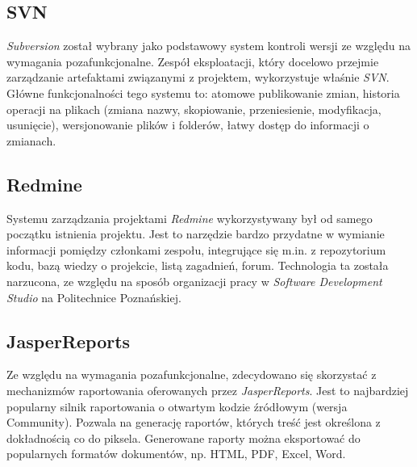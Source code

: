 \subsection{SVN}
\label{Chapter632}

\emph{Subversion} został wybrany jako podstawowy system kontroli wersji ze względu na wymagania pozafunkcjonalne. Zespół eksploatacji, który docelowo przejmie zarządzanie artefaktami związanymi z projektem, wykorzystuje właśnie \textit{SVN}. Główne funkcjonalności tego systemu to: atomowe publikowanie zmian, historia operacji na plikach (zmiana nazwy, skopiowanie, przeniesienie, modyfikacja, usunięcie), wersjonowanie plików i folderów, łatwy dostęp do informacji o zmianach.

\subsection{Redmine}
\label{Chapter633}

Systemu zarządzania projektami \emph{Redmine} wykorzystywany był od samego początku istnienia projektu. Jest to narzędzie bardzo przydatne w wymianie informacji pomiędzy członkami zespołu, integrujące się m.in. z repozytorium kodu, bazą wiedzy o projekcie, listą zagadnień, forum.  Technologia ta została narzucona, ze względu na sposób organizacji pracy w \textit{Software Development Studio} na Politechnice Poznańskiej.

\subsection{JasperReports}
\label{Chapter634}

Ze względu na wymagania pozafunkcjonalne, zdecydowano się skorzystać z mechanizmów raportowania oferowanych przez \emph{JasperReports}. Jest to najbardziej popularny silnik raportowania o otwartym kodzie źródłowym (wersja Community). Pozwala na generację raportów, których treść jest określona z dokładnością co do piksela. Generowane raporty można eksportować do popularnych formatów dokumentów, np. HTML, PDF, Excel, Word.